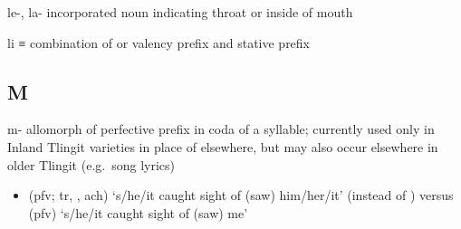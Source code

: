 \documentclass[12pt,letterpaper,oneside,article]{memoir}
\begin{document}
\begin{morphdesc}[resume*=alphalist]
\item[le-, la-]
	incorporated noun indicating throat or inside of mouth

\item[li]
	≡ 
	combination of  or  valency prefix
		and  stative prefix
\end{morphdesc}

\subsection{M}\label{sec:alphalist-m}
\begin{morphdesc}[resume*=alphalist]
\item[m-]
	allomorph of  perfective prefix in coda of a syllable;
	currently used only in Inland Tlingit varieties in place of  elsewhere,
	but may also occur elsewhere in older Tlingit (e.g.\ song lyrics)
	\begin{itemize}
	\item	{} (pfv; tr, , ach) ‘s/he/it caught sight of (saw) him/her/it’\newline
		(instead of )\newline
		versus  (pfv) ‘s/he/it caught sight of (saw) me’
	\end{itemize}
\end{morphdesc}
\end{document}
